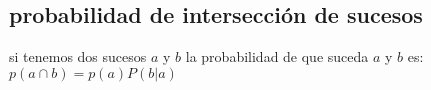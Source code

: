 \subsection{probabilidad de intersección de sucesos}
si tenemos dos sucesos $a$ y $b$ la probabilidad de que suceda $a$ y $b$ es:
$p(a\cap b)=p(a)P(b|a)$\\
